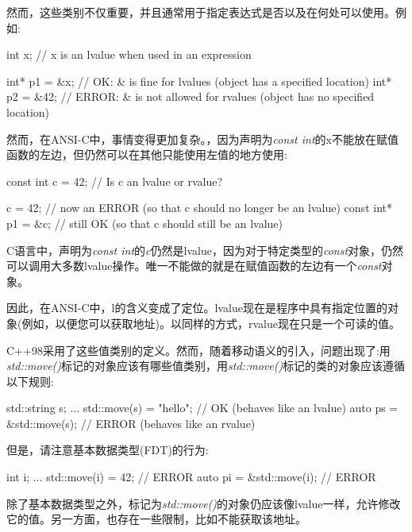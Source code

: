 然而，这些类别不仅重要，并且通常用于指定表达式是否以及在何处可以使用。例如:\par

\begin{codebox}[cpp]
int x; // x is an lvalue when used in an expression

int* p1 = &x; // OK: & is fine for lvalues (object has a specified location)
int* p2 = &42; // ERROR: & is not allowed for rvalues (object has no specified location)
\end{codebox}

然而，在ANSI-C中，事情变得更加复杂。，因为声明为\textit{const int}的x不能放在赋值函数的左边，但仍然可以在其他只能使用左值的地方使用:\par

\begin{codebox}[cpp]
const int c = 42; // Is c an lvalue or rvalue?

c = 42; // now an ERROR (so that c should no longer be an lvalue)
const int* p1 = &c; // still OK (so that c should still be an lvalue)
\end{codebox}

C语言中，声明为\textit{const int}的\textit{c}仍然是lvalue，因为对于特定类型的\textit{const}对象，仍然可以调用大多数lvalue操作。唯一不能做的就是在赋值函数的左边有一个\textit{const}对象。\par

因此，在ANSI-C中，l的含义变成了定位。lvalue现在是程序中具有指定位置的对象(例如，以便您可以获取地址)。以同样的方式，rvalue现在只是一个可读的值。\par

C++98采用了这些值类别的定义。然而，随着移动语义的引入，问题出现了:用\textit{std::move()}标记的对象应该有哪些值类别，用\textit{std::move()}标记的类的对象应该遵循以下规则:\par

\begin{codebox}[cpp]
std::string s;
...
std::move(s) = "hello"; // OK (behaves like an lvalue)
auto ps = &std::move(s); // ERROR (behaves like an rvalue)
\end{codebox}

但是，请注意基本数据类型(FDT)的行为:\par

\begin{codebox}[cpp]
int i;
...
std::move(i) = 42; // ERROR
auto pi = &std::move(i); // ERROR
\end{codebox}

除了基本数据类型之外，标记为\textit{std::move()}的对象仍应该像lvalue一样，允许修改它的值。另一方面，也存在一些限制，比如不能获取该地址。\par

